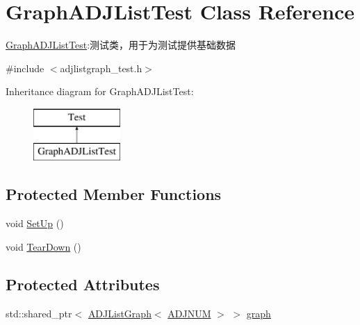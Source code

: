 \hypertarget{class_graph_a_d_j_list_test}{}\section{Graph\+A\+D\+J\+List\+Test Class Reference}
\label{class_graph_a_d_j_list_test}


\hyperlink{class_graph_a_d_j_list_test}{Graph\+A\+D\+J\+List\+Test}\+:测试类，用于为测试提供基础数据  




{\ttfamily \#include $<$adjlistgraph\+\_\+test.\+h$>$}

Inheritance diagram for Graph\+A\+D\+J\+List\+Test\+:\begin{figure}[H]
\begin{center}
\leavevmode
\includegraphics[height=2.000000cm]{class_graph_a_d_j_list_test}
\end{center}
\end{figure}
\subsection*{Protected Member Functions}
\begin{DoxyCompactItemize}
\item 
void \hyperlink{class_graph_a_d_j_list_test_a72021ff735af11b1db48290ea0fa8a6b}{Set\+Up} ()
\item 
void \hyperlink{class_graph_a_d_j_list_test_a79dc8e149913c35045b362c44a5fed46}{Tear\+Down} ()
\end{DoxyCompactItemize}
\subsection*{Protected Attributes}
\begin{DoxyCompactItemize}
\item 
std\+::shared\+\_\+ptr$<$ \hyperlink{struct_introduction_to_algorithm_1_1_graph_algorithm_1_1_a_d_j_list_graph}{A\+D\+J\+List\+Graph}$<$ \hyperlink{adjlistgraph__test_8h_aeadd4e667d8d2697ccf51be021be0f5c}{A\+D\+J\+N\+U\+M} $>$ $>$ \hyperlink{class_graph_a_d_j_list_test_a2c21124ba286c96f94f6f0b036d5644e}{graph}
\end{DoxyCompactItemize}


